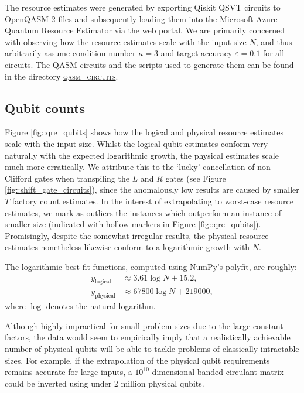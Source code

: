 \documentclass[10pt, twocolumn]{article}
\begin{document}
The resource estimates were generated by exporting Qiskit QSVT circuits to OpenQASM 2 files and subsequently loading them into the Microsoft Azure Quantum Resource Estimator via the web portal. We are primarily concerned with observing how the resource estimates scale with the input size $N$, and thus arbitrarily assume condition number $\kappa=3$ and target accuracy $\varepsilon=0.1$ for all circuits. The QASM circuits and the scripts used to generate them can be found in the directory \href{https://github.com/Walden-Killick/QCE24-QRE-Challenge/tree/main/qasm_circuits}{\textsc{qasm\_circuits}}.

\subsection{Qubit counts}

Figure \ref{fig::qre_qubits} shows how the logical and physical resource estimates scale with the input size. Whilst the logical qubit estimates conform very naturally with the expected logarithmic growth, the physical estimates scale much more erratically. We attribute this to the `lucky' cancellation of non-Clifford gates when transpiling the $L$ and $R$ gates (see Figure \ref{fig::shift_gate_circuits}), since the anomalously low results are caused by smaller $T$ factory count estimates. In the interest of extrapolating to worst-case resource estimates, we mark as outliers the instances which outperform an instance of smaller size (indicated with hollow markers in Figure \ref{fig::qre_qubits}). Promisingly, despite the somewhat irregular results, the physical resource estimates nonetheless likewise conform to a logarithmic growth with $N$.

The logarithmic best-fit functions, computed using NumPy's polyfit, are roughly:
\begin{align*}
	y_\text{logical} &\approx 3.61 \log{N} + 15.2, \\
	y_\text{physical} &\approx 67800 \log{N} + 219000,
\end{align*}
where $\log$ denotes the natural logarithm.

Although highly impractical for small problem sizes due to the large constant factors, the data would seem to empirically imply that a realistically achievable number of physical qubits will be able to tackle problems of classically intractable sizes. For example, if the extrapolation of the physical qubit requirements remains accurate for large inputs, a $10^{10}$-dimensional banded circulant matrix could be inverted using under 2 million physical qubits.
\end{document}
